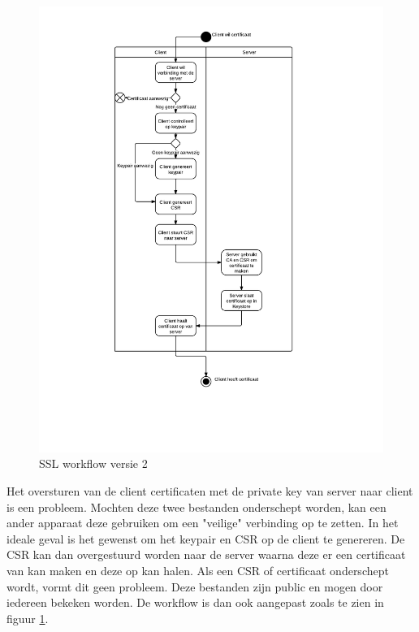 \documentclass[]{article}
\begin{document}
\begin{figure}[htpb]
   \begin{center}
     \includegraphics[height=\textheight]{ssl_ad_2.pdf}
   \end{center}
   \caption{SSL workflow versie 2}
   \label{ssl_ad_2}
\end{figure}

Het oversturen van de client certificaten met de private key van server naar
client is een probleem. Mochten deze twee bestanden onderschept worden, kan een
ander apparaat deze gebruiken om een "veilige" verbinding op te zetten. In het
ideale geval is het gewenst om het keypair en CSR op de client te genereren. De
CSR kan dan overgestuurd worden naar de server waarna deze er een certificaat
van kan maken en deze op kan halen. Als een CSR of certificaat onderschept
wordt, vormt dit geen probleem. Deze bestanden zijn public en mogen door
iedereen bekeken worden. De workflow is dan ook aangepast zoals te zien in
figuur \ref{ssl_ad_2}.
\end{document}
